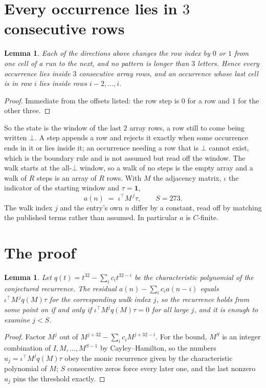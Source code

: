 \documentclass[11pt,a4paper]{article}
\theoremstyle{plain}
\newtheorem{lemma}[theorem]{Lemma}
\theoremstyle{definition}
\begin{document}
\section{Every occurrence lies in $3$ consecutive rows}

\begin{lemma}\label{lem:win}
Each of the directions above changes the row index by $0$ or $1$ from one cell of a run to the
next, and no pattern is longer than $3$ letters. Hence every occurrence lies inside $3$
consecutive array rows, and an occurrence whose last cell is in row $i$ lies inside rows
$i-2,\dots,i$.
\end{lemma}

\begin{proof}
Immediate from the offsets listed: the row step is $0$ for a row and $1$ for the other three.
\end{proof}

So the state is the window of the last $2$ array rows, a row still to come being written
$\bot$. A step appends a row and rejects it exactly when some occurrence ends in it or lies
inside it; an occurrence needing a row that is $\bot$ cannot exist, which is the boundary rule
and is not assumed but read off the window. The walk starts at the all-$\bot$ window, so a walk
of no steps is the empty array and a walk of $R$ steps is an array of $R$ rows. With $M$ the
adjacency matrix, $\iota$ the indicator of the starting window and $\tau=\mathbf{1}$,
\[
a(n)\;=\;\iota^{\!\top}M^{\,j}\tau ,\qquad S=273.
\]
The walk index $j$ and the entry's own $n$ differ by a constant, read off by matching the
published terms rather than assumed. In particular $a$ is $C$-finite.

\section{The proof}

\begin{lemma}\label{lem:crit}
Let $q(t)=t^{32}-\sum_i c_it^{32-i}$ be the characteristic polynomial of the
conjectured recurrence. The residual $a(n)-\sum_ic_ia(n-i)$ equals
$\iota^{\!\top}M^{\,j}q(M)\tau$ for the corresponding walk index $j$, so the recurrence
holds from some point on if and only if $\iota^{\!\top}M^{j}q(M)\tau=0$ for all large $j$,
and it is enough to examine $j<S$.
\end{lemma}

\begin{proof}
Factor $M^{j}$ out of $M^{j+32}-\sum_ic_iM^{j+32-i}$. For the bound, $M^{S}$
is an integer combination of $I,M,\dots,M^{S-1}$ by Cayley--Hamilton, so the numbers
$u_j=\iota^{\!\top}M^{j}q(M)\tau$ obey the monic recurrence given by the characteristic
polynomial of $M$; $S$ consecutive zeros force every later one, and the last nonzero $u_j$
pins the threshold exactly.
\end{proof}
\end{document}
